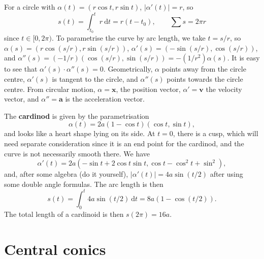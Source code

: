 \documentclass[letter-paper]{tufte-book}
\newenvironment{example}[1][Example]{\begin{trivlist}
\item[\hskip \labelsep {\bfseries #1}]}{\end{trivlist}}
\newcommand{\ab}{\boldsymbol{a}}
\newcommand{\vb}{\boldsymbol{v}}
\newcommand{\xb}{\boldsymbol{x}}
\newcommand\Def[1]{\textbf{#1}}
\begin{document}
\begin{example}
	For a circle with $\alpha(t)=(r\cos t, r\sin t)$, $|\alpha'(t)|=r$, so
	\begin{equation*}
		s(t)=\int_{t_0}^t r\ \mathrm{d}t = r(t-t_0),\qquad
		\sum s = 2\pi r
	\end{equation*}
	since $t\in[0,2\pi)$. To parametrise the curve by arc length, we take
	$t=s/r$, so $\alpha(s)=(r\cos (s/r), r\sin(s/r))$, $\alpha'(s)=(-\sin (s/r),
	\cos(s/r))$, and $\alpha''(s)=(-1/r)(\cos(s/r),
	\sin(s/r))=-(1/r^2)\alpha(s)$. It is easy to see that
	$\alpha'(s)\cdot\alpha''(s)=0$. Geometrically, $\alpha$ points away from the
	circle centre, $\alpha'(s)$ is tangent to the circle, and $\alpha''(s)$
	points towards the circle centre. From circular motion, $\alpha=\xb$, the
	position vector, $\alpha'=\vb$ the velocity vector, and $\alpha''=\ab$ is
	the acceleration vector.
\end{example}

\begin{example}
	The \Def{cardinod} is given by the parametrisation
	\begin{equation*}
		\alpha(t)=2a(1-\cos t)(\cos t, \sin t),
	\end{equation*}
	and looks like a heart shape lying on its side. At $t=0$, there is a cusp,
	which will need separate consideration since it is an end point for the
	cardinod, and the curve is not necessarily smooth there. We have
	\begin{equation*}
		\alpha'(t)=2a(-\sin t+2\cos t\sin t, \cos t-\cos^2 t + \sin^2),
	\end{equation*}
	and, after some algebra (do it yourself), $|\alpha'(t)|=4a\sin (t/2)$ after
	using some double angle formulas. The arc length is then
	\begin{equation*}
		s(t)=\int_0^t 4a\sin(t/2)\ \mathrm{d}t=8a(1-\cos(t/2)).
	\end{equation*}
	The total length of a cardinoid is then	$s(2\pi)=16a$.
\end{example}


\section{Central conics}
\end{document}
